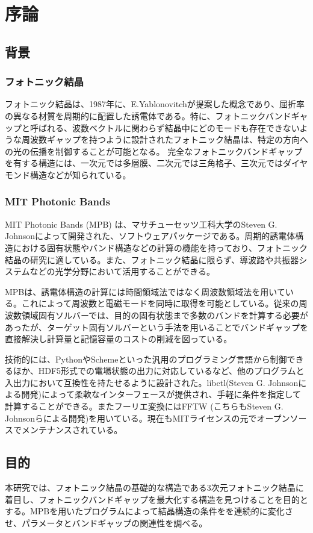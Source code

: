 \documentclass[platex,dvipdfmx]{jsreport}
\begin{document}
\chapter{序論}


\section{背景}

\subsection{フォトニック結晶}


フォトニック結晶は、1987年に、E.Yablonovitchが提案した概念であり、屈折率の異なる材質を周期的に配置した誘電体である。特に、フォトニックバンドギャップと呼ばれる、波数ベクトルに関わらず結晶中にどのモードも存在できないような周波数ギャップを持つように設計されたフォトニック結晶は、特定の方向への光の伝播を制御することが可能となる。
完全なフォトニックバンドギャップを有する構造には、一次元では多層膜、二次元では三角格子、三次元ではダイヤモンド構造などが知られている。


\subsection{MIT Photonic Bands}

MIT Photonic Bands (MPB) は、マサチューセッツ工科大学のSteven G. Johnsonによって開発された、ソフトウェアパッケージである。周期的誘電体構造における固有状態やバンド構造などの計算の機能を持っており、フォトニック結晶の研究に適している。また、フォトニック結晶に限らず、導波路や共振器システムなどの光学分野において活用することができる。

MPBは、誘電体構造の計算には時間領域法ではなく周波数領域法を用いている。これによって周波数と電磁モードを同時に取得を可能としている。従来の周波数領域固有ソルバーでは、目的の固有状態まで多数のバンドを計算する必要があったが、ターゲット固有ソルバーという手法を用いることでバンドギャップを直接解決し計算量と記憶容量のコストの削減を図っている。


技術的には、PythonやSchemeといった汎用のプログラミング言語から制御できるほか、HDF5形式での電場状態の出力に対応しているなど、他のプログラムと入出力において互換性を持たせるように設計された。libctl(Steven G. Johnsonによる開発)によって柔軟なインターフェースが提供され、手軽に条件を指定して計算することができる。またフーリエ変換にはFFTW (こちらもSteven G. Johnsonらによる開発)を用いている。現在もMITライセンスの元でオープンソースでメンテナンスされている。


\section{目的}
本研究では、フォトニック結晶の基礎的な構造である3次元フォトニック結晶に着目し、フォトニックバンドギャップを最大化する構造を見つけることを目的とする。MPBを用いたプログラムによって結晶構造の条件をを連続的に変化させ、パラメータとバンドギャップの関連性を調べる。
\end{document}

